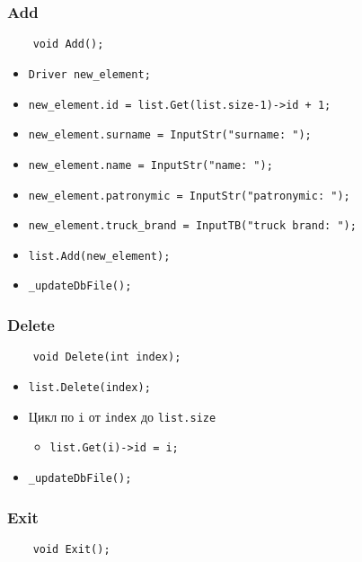 \subsubsection{Add}

\begin{lstlisting}
    void Add();
\end{lstlisting}

\begin{itemize}
    \item \verb|Driver new_element;|
    \item \verb|new_element.id = list.Get(list.size-1)->id + 1;|
    \item \verb|new_element.surname = InputStr("surname: ");|
    \item \verb|new_element.name = InputStr("name: ");|
    \item \verb|new_element.patronymic = InputStr("patronymic: ");|
    \item \verb|new_element.truck_brand = InputTB("truck brand: ");|
    \item \verb|list.Add(new_element);|
    \item \verb|_updateDbFile();|
\end{itemize}

\subsubsection{Delete}

\begin{lstlisting}
    void Delete(int index);
\end{lstlisting}

\begin{itemize}
    \item \verb|list.Delete(index);|
    \item Цикл по \verb|i| от \verb|index| до \verb|list.size| 
    \begin{itemize}
        \item \verb|list.Get(i)->id = i;|
    \end{itemize}
    \item \verb|_updateDbFile();|
\end{itemize}

\subsubsection{Exit}

\begin{lstlisting}
    void Exit();
\end{lstlisting}

